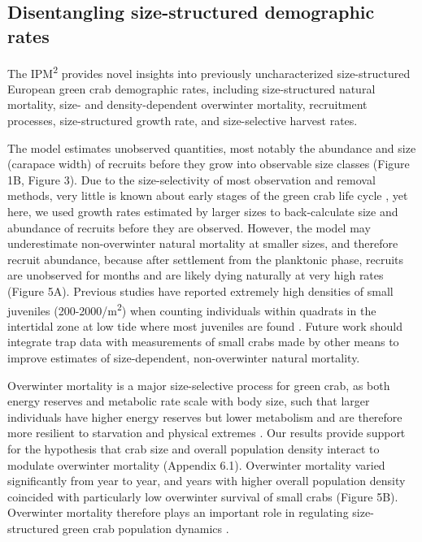 \documentclass{article}
\begin{document}
\subsection{Disentangling size-structured demographic rates}

The IPM\textsuperscript{2} provides novel insights into previously uncharacterized size-structured European green crab demographic rates, including size-structured natural mortality, size- and density-dependent overwinter mortality, recruitment processes, size-structured growth rate, and size-selective harvest rates. 

The model estimates unobserved quantities, most notably the abundance and size (carapace width) of recruits before they grow into observable size classes (Figure 1B, Figure 3). Due to the size-selectivity of most observation and removal methods, very little is known about early stages of the green crab life cycle \parencite{yamada2005growth}, yet here, we used growth rates estimated by larger sizes to back-calculate size and abundance of recruits before they are observed. However, the model may underestimate non-overwinter natural mortality at smaller sizes, and therefore recruit abundance, because after settlement from the planktonic phase, recruits are unobserved for months and are likely dying naturally at very high rates (Figure 5A). Previous studies have reported extremely high densities of small juveniles (200-2000/m\textsuperscript{2}) when counting individuals within quadrats in the intertidal zone at low tide where most juveniles are found \parencite{breteler1976settlement, thiel1994recruitment}. Future work should integrate trap data with measurements of small crabs made by other means to improve estimates of size-dependent, non-overwinter natural mortality.

Overwinter mortality is a major size-selective process for green crab, as both energy reserves and metabolic rate scale with body size, such that larger individuals have higher energy reserves but lower metabolism and are therefore more resilient to starvation and physical extremes \parencite{carlson2008seasonal, sogard1997size}. Our results provide support for the hypothesis that crab size and overall population density interact to modulate overwinter mortality (Appendix 6.1). Overwinter mortality varied significantly from year to year, and years with higher overall population density coincided with particularly low overwinter survival of small crabs (Figure 5B). Overwinter mortality therefore plays an important role in regulating size-structured green crab population dynamics \parencite{henderson1988size}. 
\end{document}
